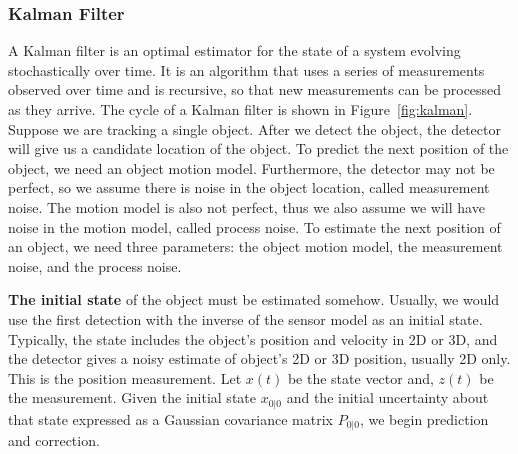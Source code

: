 \subsubsection{Kalman Filter}
A Kalman filter is an optimal estimator for the state of a system evolving stochastically over time. It is an algorithm that uses a series of measurements observed over time and is recursive, so that new measurements can be processed as they arrive. The cycle of a Kalman filter is shown in Figure~\ref{fig:kalman}. Suppose we are tracking a single object. After we detect the object, the detector will give us a candidate location of the object. To predict the next position of the object, we need an object motion model. Furthermore, the detector may not be perfect, so  we assume there is noise in the object location, called measurement noise. The motion model is also not perfect, thus we also assume we will have noise in the motion model, called process noise. To estimate the next position of an object, we need three parameters: the object motion model, the measurement noise, and the process noise.

\textbf{The initial state} of the object must be estimated somehow. Usually, we would use the first detection with the inverse of the sensor model as an initial state. Typically, the state includes the object's position and velocity in 2D or 3D, and the detector gives a noisy estimate of object's  2D or 3D position, usually 2D only. This is the position measurement. Let $x(t)$ be the state vector and, $z(t)$ be the measurement. Given the initial state $x_{0|0}$ and the initial uncertainty about that state expressed as a Gaussian covariance matrix $P_{0|0}$, we begin prediction and correction.


